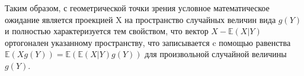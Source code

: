 Таким образом, с геометрической точки зрения условное математическое ожидание является проекцией X на пространство случайных величин вида $g(Y)$ и полностью характеризуется тем свойством, что вектор $X - \mathbb{E}(X|Y)$ ортогонален указанному пространству, что записывается c помощью равенства $\mathbb{E}(Xg(Y)) = \mathbb{E}(\mathbb{E}(X|Y)g(Y))$ для произвольной случайной величины $g(Y)$.